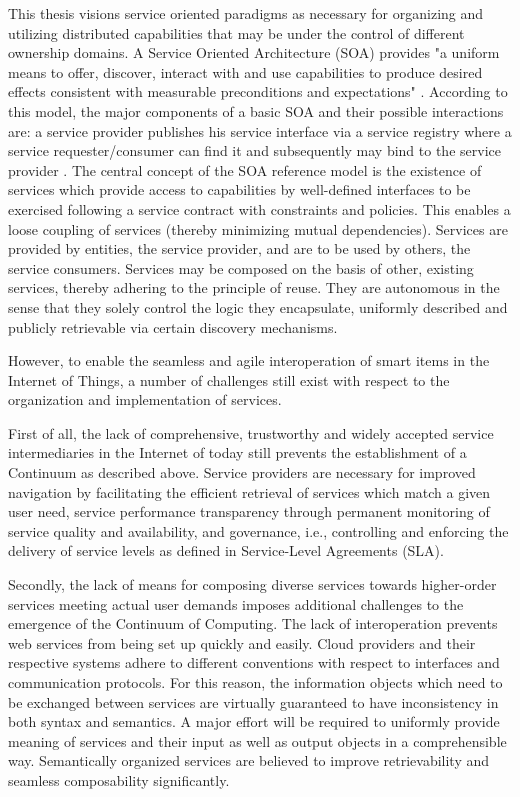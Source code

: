 \documentclass{ieeeaccess}
\begin{document}
This thesis visions service oriented paradigms as necessary for organizing and utilizing distributed capabilities that may be under the control of different ownership domains. A Service Oriented Architecture (SOA) provides "a uniform means to offer, discover, interact with and use capabilities to produce desired effects consistent with measurable preconditions and expectations" \cite{oasis}. According to this model, the major components of a basic SOA and their possible interactions are: a service provider publishes his service interface via a service registry where a service requester/consumer can find it and subsequently may bind to the service provider \cite{iot-enterprise}. The central concept of the SOA reference model is the existence of services which provide access to capabilities by well-defined interfaces to be exercised following a service contract with constraints and policies. This enables a loose coupling of services (thereby minimizing mutual dependencies). Services are provided by entities, the service provider, and are to be used by others, the service consumers. Services may be composed on the basis of other, existing services, thereby adhering to the principle of reuse. They are autonomous in the sense that they solely control the logic they encapsulate, uniformly described and publicly retrievable via certain discovery mechanisms. 

However, to enable the seamless and agile interoperation of smart items in the Internet of Things, a number of challenges still exist with respect to the organization and implementation of services.

First of all, the lack of comprehensive, trustworthy and widely accepted service intermediaries in the Internet of today still prevents the establishment of a Continuum as described above. Service providers are necessary for improved navigation by facilitating the efficient retrieval of services which match a given user need, service performance transparency through permanent monitoring of service quality and availability, and governance, i.e., controlling and enforcing the delivery of service levels as defined in Service-Level Agreements (SLA).

Secondly, the lack of means for composing diverse services towards higher-order services meeting actual user demands imposes additional challenges to the emergence of the Continuum of Computing. The lack of interoperation prevents web services from being set up quickly and easily. Cloud providers and their respective systems adhere to different conventions with respect to interfaces and communication protocols. For this reason, the information objects which need to be exchanged between services are virtually guaranteed to have inconsistency in both syntax and semantics. A major effort will be required to uniformly provide meaning of services and their input as well as output objects in a comprehensible way. Semantically organized services are believed to improve retrievability and seamless composability significantly.
\end{document}
